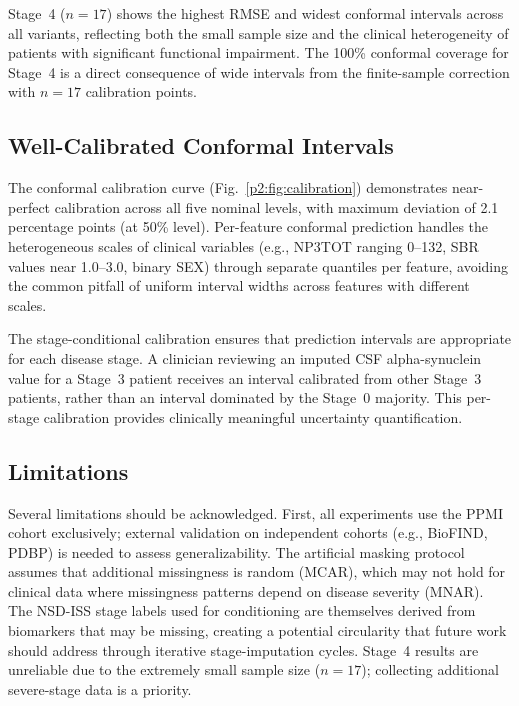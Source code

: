 Stage~4 ($n = 17$) shows the highest RMSE and widest conformal intervals across all variants, reflecting both the small sample size and the clinical heterogeneity of patients with significant functional impairment. The 100\% conformal coverage for Stage~4 is a direct consequence of wide intervals from the finite-sample correction with $n = 17$ calibration points.

\subsection{Well-Calibrated Conformal Intervals}

The conformal calibration curve (Fig.~\ref{p2:fig:calibration}) demonstrates near-perfect calibration across all five nominal levels, with maximum deviation of 2.1 percentage points (at 50\% level). Per-feature conformal prediction handles the heterogeneous scales of clinical variables (e.g., NP3TOT ranging 0--132, SBR values near 1.0--3.0, binary SEX) through separate quantiles per feature, avoiding the common pitfall of uniform interval widths across features with different scales.

The stage-conditional calibration ensures that prediction intervals are appropriate for each disease stage. A clinician reviewing an imputed CSF alpha-synuclein value for a Stage~3 patient receives an interval calibrated from other Stage~3 patients, rather than an interval dominated by the Stage~0 majority. This per-stage calibration provides clinically meaningful uncertainty quantification.

\subsection{Limitations}

Several limitations should be acknowledged. First, all experiments use the PPMI cohort exclusively; external validation on independent cohorts (e.g., BioFIND, PDBP) is needed to assess generalizability. The artificial masking protocol assumes that additional missingness is random (MCAR), which may not hold for clinical data where missingness patterns depend on disease severity (MNAR). The NSD-ISS stage labels used for conditioning are themselves derived from biomarkers that may be missing, creating a potential circularity that future work should address through iterative stage-imputation cycles. Stage~4 results are unreliable due to the extremely small sample size ($n = 17$); collecting additional severe-stage data is a priority.

